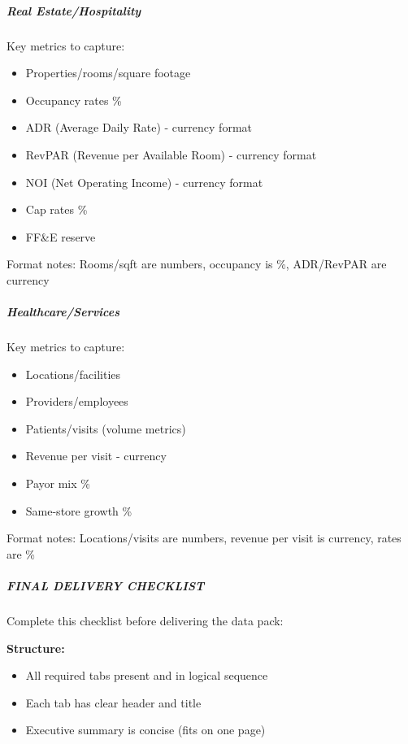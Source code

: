\documentclass[11pt]{article}
\begin{document}
\subparagraph{Real Estate/Hospitality}\mbox{}\par
Key metrics to capture:

\begin{itemize}[leftmargin=*,itemsep=2pt,topsep=2pt]
\item {} Properties/rooms/square footage
\item {} Occupancy rates \%
\item {} ADR (Average Daily Rate) - currency format
\item {} RevPAR (Revenue per Available Room) - currency format
\item {} NOI (Net Operating Income) - currency format
\item {} Cap rates \%
\item {} FF\&E reserve
\end{itemize}

Format notes: Rooms/sqft are numbers, occupancy is \%, ADR/RevPAR are currency


\subparagraph{Healthcare/Services}\mbox{}\par
Key metrics to capture:

\begin{itemize}[leftmargin=*,itemsep=2pt,topsep=2pt]
\item {} Locations/facilities
\item {} Providers/employees
\item {} Patients/visits (volume metrics)
\item {} Revenue per visit - currency
\item {} Payor mix \%
\item {} Same-store growth \%
\end{itemize}

Format notes: Locations/visits are numbers, revenue per visit is currency, rates are \%


\subparagraph{FINAL DELIVERY CHECKLIST}\mbox{}\par

Complete this checklist before delivering the data pack:


\textbf{Structure:}

\begin{itemize}[leftmargin=*,itemsep=2pt,topsep=2pt]
\item {} All required tabs present and in logical sequence
\item {} Each tab has clear header and title
\item {} Executive summary is concise (fits on one page)
\end{itemize}
\end{document}

